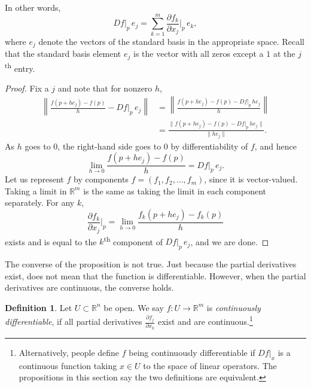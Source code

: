 \documentclass[12pt,openany]{book}
\newcommand{\snorm}[1]{\lVert {#1} \rVert}
\newcommand{\norm}[1]{\left\lVert {#1} \right\rVert}
\newcommand{\R}{{\mathbb{R}}}
\newcommand{\myindex}[1]{#1\index{#1}}
\theoremstyle{plain}
\theoremstyle{remark}
\theoremstyle{definition}
\newtheorem{defn}[thm]{Definition}
\theoremstyle{exercise}
\theoremstyle{example}
\begin{document}
In other words,
\begin{equation*}
Df|_p \, e_j =
\sum_{k=1}^m
\frac{\partial f_k}{\partial x_j}\Big|_p \,e_k ,
\end{equation*}
where $e_j$ denote the vectors of the standard basis in the appropriate
space.  Recall that the standard basis element $e_j$ is the vector with all
zeros except a $1$ at the $j$\textsuperscript{th} entry.

\begin{proof}
Fix a $j$ and note that for nonzero $h$,
\begin{equation*}
\begin{split}
\norm{\frac{f(p+h e_j)-f(p)}{h} - Df|_p \, e_j} & = 
\norm{\frac{f(p+h e_j)-f(p) - Df|_p \, h e_j}{h}} \\
& =
\frac{\snorm{f(p+h e_j)-f(p) - Df|_p \, h e_j}}{\snorm{h e_j}} .
\end{split}
\end{equation*}
As $h$ goes to $0$, the right-hand side goes to $0$ by
differentiability of $f$, and hence
\begin{equation*}
\lim_{h \to 0}
\frac{f(p+h e_j)-f(p)}{h} = Df|_p \, e_j  .
\end{equation*}
Let us represent $f$ by components
$f = (f_1,f_2,\ldots,f_m)$, since it is vector-valued.
Taking a limit in $\R^m$
is the same as taking the limit in each component separately.  
For any $k$,
\begin{equation*}
\frac{\partial f_k}{\partial x_j} \Big|_p
=
\lim_{h \to 0}
\frac{f_k(p+h e_j)-f_k(p)}{h}
\end{equation*}
exists and 
is equal to the $k$\textsuperscript{th} component of $Df|_p\, e_j$, and we are done.
\end{proof}

The converse of the proposition is not true.  Just because the partial
derivatives exist, does not mean that the function is differentiable.
However, when the partial derivatives are continuous, the
converse holds.


\begin{defn}
Let $U \subset \R^n$ be open.
We say $f \colon U \to \R^m$ is
\emph{\myindex{continuously differentiable}},
if all partial derivatives
$\frac{\partial f_j}{\partial x_k}$ exist and are continuous.\footnote{%
Alternatively, people define $f$ being continuously differentiable
if $Df|_x$ is a continuous function taking $x \in U$ to the space of linear
operators.  The propositions in this section say the two definitions are equivalent.}
\end{defn}
\end{document}
